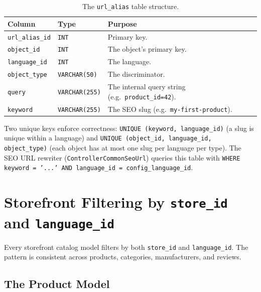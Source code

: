 \documentclass[11pt,a4paper]{article}
\begin{document}
\begin{table}[htbp]
\centering
\caption{The \texttt{url\_alias} table structure.}\label{tab:url-alias}
\small
\begin{tabularx}{\columnwidth}{llX}
\toprule
\textbf{Column} & \textbf{Type} & \textbf{Purpose} \\
\midrule
\texttt{url\_alias\_id} & \texttt{INT} & Primary key. \\
\texttt{object\_id}     & \texttt{INT} & The object's primary key. \\
\texttt{language\_id}   & \texttt{INT} & The language. \\
\texttt{object\_type}   & \texttt{VARCHAR(50)} & The discriminator. \\
\texttt{query}          & \texttt{VARCHAR(255)} & The internal query string (e.g.\ \texttt{product\_id=42}). \\
\texttt{keyword}        & \texttt{VARCHAR(255)} & The SEO slug (e.g.\ \texttt{my-first-product}). \\
\bottomrule
\end{tabularx}
\end{table}

Two unique keys enforce correctness:
\texttt{UNIQUE (keyword, language\_id)} (a slug is unique within a
language) and \texttt{UNIQUE (object\_id, language\_id, object\_type)}
(each object has at most one slug per language per type). The SEO URL
rewriter (\texttt{ControllerCommonSeoUrl}) queries this table with
\texttt{WHERE keyword = '...' AND language\_id = config\_language\_id}.

\section{Storefront Filtering by \texttt{store\_id} and \texttt{language\_id}}\label{sec:storefront-filtering}

Every storefront catalog model filters by both \texttt{store\_id} and
\texttt{language\_id}. The pattern is consistent across products,
categories, manufacturers, and reviews.

\subsection{The Product Model}
\end{document}
